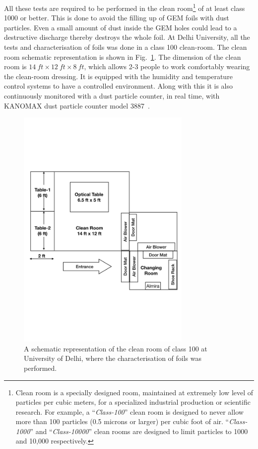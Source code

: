 All these tests are required to be performed in the clean room\footnote{Clean room is a specially designed room, maintained at extremely low level of particles per cubic meters, for a specialized industrial production or scientific research.
For example, a ``\textit{Class-100}'' clean room is designed to never allow more than 100 particles (0.5 microns or larger) per cubic foot of air. ``\textit{Class-1000}'' and ``\textit{Class-10000}'' clean rooms are designed to limit particles to 1000 and 10,000 respectively.} of at least class 1000 or better.
This is done to avoid the filling up of GEM foils with dust particles.
Even a small amount of dust inside the GEM holes could lead to a destructive discharge thereby destroys the whole foil.
At Delhi University, all the tests and characterisation of foils was done in a class 100 clean-room. The clean room schematic representation is shown in Fig.~\ref{fig:clean_room_DelhiUniv}. The dimension of the clean room is $14~ft\times 12~ft \times 8~ft$, which allows 2-3 people to work comfortably wearing the clean-room dressing. It is equipped with the humidity and temperature control systems to have a controlled environment. Along with this it is also continuously monitored with a dust particle counter, in real time, with KANOMAX dust particle counter model 3887~\cite{KANOMAX-dust-particle-counter}.
\begin{figure}[!htbp]
    \centering
    \includegraphics[width=0.75\textwidth]{figures/GEM/Delhi_university_CleanRoom.pdf}
    \caption{A schematic representation of the clean room of class 100 at University of Delhi, where the characterisation of foils was performed.}
    \label{fig:clean_room_DelhiUniv}
\end{figure}


